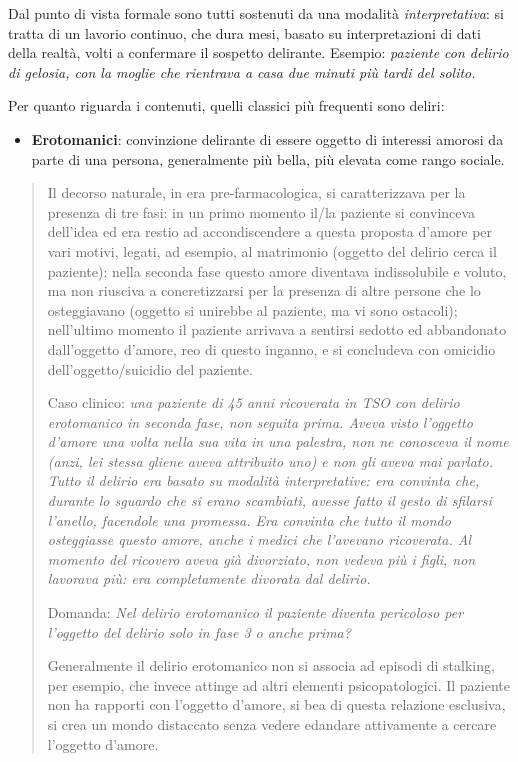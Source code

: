 \documentclass[]{article}
\begin{document}
Dal punto di vista formale sono tutti sostenuti da una modalità
\emph{interpretativa}: si tratta di un lavorio continuo, che dura mesi,
basato su interpretazioni di dati della realtà, volti a confermare il
sospetto delirante. Esempio: \emph{paziente con delirio di gelosia, con
la moglie che rientrava a casa due minuti più tardi del solito.}

Per quanto riguarda i contenuti, quelli classici più frequenti sono
deliri:

\begin{itemize}
\item
  \textbf{Erotomanici}: convinzione delirante di essere oggetto di
  interessi amorosi da parte di una persona, generalmente più bella, più
  elevata come rango sociale.
\end{itemize}

\begin{quote}
Il decorso naturale, in era pre-farmacologica, si caratterizzava per la
presenza di tre fasi: in un primo momento il/la paziente si convinceva
dell'idea ed era restio ad accondiscendere a questa proposta d'amore per
vari motivi, legati, ad esempio, al matrimonio (oggetto del delirio
cerca il paziente); nella seconda fase questo amore diventava
indissolubile e voluto, ma non riusciva a concretizzarsi per la presenza
di altre persone che lo osteggiavano (oggetto si unirebbe al paziente,
ma vi sono ostacoli); nell'ultimo momento il paziente arrivava a
sentirsi sedotto ed abbandonato dall'oggetto d'amore, reo di questo
inganno, e si concludeva con omicidio dell'oggetto/suicidio del
paziente.

Caso clinico: \emph{una paziente di 45 anni ricoverata in TSO con
delirio erotomanico in seconda fase, non seguita prima. Aveva visto
l'oggetto d'amore una volta nella sua vita in una palestra, non ne
conosceva il nome (anzi, lei stessa gliene aveva attribuito uno) e non
gli aveva mai parlato. Tutto il delirio era basato su modalità
interpretative: era convinta che, durante lo sguardo che si erano
scambiati, avesse fatto il gesto di sfilarsi l'anello, facendole una
promessa. Era convinta che tutto il mondo osteggiasse questo amore,
anche i medici che l'avevano ricoverata. Al momento del ricovero aveva
già divorziato, non vedeva più i figli, non lavorava più: era
completamente divorata dal delirio.}

Domanda: \emph{Nel delirio erotomanico il paziente diventa pericoloso
per l'oggetto del delirio solo in fase 3 o anche prima?}

Generalmente il delirio erotomanico non si associa ad episodi di
stalking, per esempio, che invece attinge ad altri elementi
psicopatologici. Il paziente non ha rapporti con l'oggetto d'amore, si
bea di questa relazione esclusiva, si crea un mondo distaccato senza
vedere edandare attivamente a cercare l'oggetto d'amore.
\end{quote}
\end{document}
